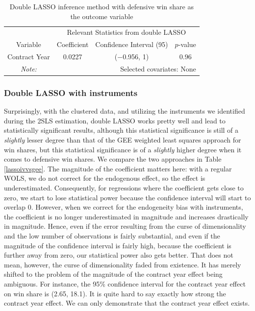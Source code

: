 \documentclass[12pt]{article}
\begin{document}
	\begin{table}[!htbp]
		\centering
		\caption{Double LASSO inference method with defensive win share as the outcome variable}
		\label{lassodws} 
		\begin{tabular}{*4c}
			\toprule
			& \multicolumn{3}{c}{Relevant Statistics from double LASSO} \\
			\cmidrule(lr){2-4}
			Variable & Coefficient  & Confidence Interval (95) & $p$-value \\
			\midrule
			Contract Year & 0.0227       & ($-$0.956, 1) & $0.96$       \\
			\bottomrule
			\textit{Note:}  & \multicolumn{3}{r}{Selected covariates: None} \\
		\end{tabular}
	\end{table}
	
	\subsubsection{Double LASSO with instruments}
	
	Surprisingly, with the clustered data, and utilizing the instruments we identified during the 2SLS estimation, double LASSO works pretty well and lead to statistically significant results, although this statistical significance is still of a \emph{slightly} lesser degree than that of the GEE weighted least squares approach for win shares, but this statistical significance is of a \emph{slightly} higher degree when it comes to defensive win shares. We compare the two approaches in Table \ref{lassoivvsgee}. The magnitude of the coefficient matters here: with a regular WOLS, we do not correct for the endogenous effect, so the effect is underestimated. Consequently, for regressions where the coefficient gets close to zero, we start to lose statistical power because the confidence interval will start to overlap $0$. However, when we correct for the endogeneity bias with instruments, the coefficient is no longer underestimated in magnitude and increases drastically in magnitude. Hence, even if the error resulting from the curse of dimensionality and the low number of observations is fairly substantial, and even if the magnitude of the confidence interval is fairly high, because the coefficient is further away from zero, our statistical power also gets better. That does not mean, however, the curse of dimensionality faded from existence. It has merely shifted to the problem of the magnitude of the contract year effect being ambiguous. For instance, the 95\% confidence interval for the contract year effect on win share is (2.65, 18.1). It is quite hard to say exactly how strong the contract year effect. We can only demonstrate that the contract year effect exists.
	
\end{document}
